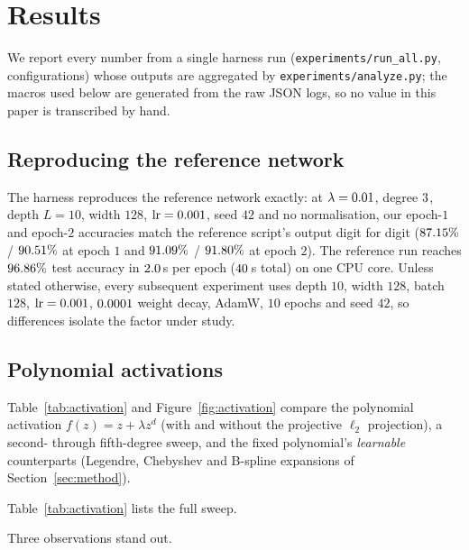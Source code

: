 \section{Results}
\label{sec:results}

We report every number from a single harness run
(\texttt{experiments/run\_all.py}, \nCfgs{} configurations) whose outputs are
aggregated by \texttt{experiments/analyze.py}; the macros used below are
generated from the raw JSON logs, so no value in this paper is transcribed by
hand.

\subsection{Reproducing the reference network}

The harness reproduces the reference network exactly: at
$\lambda=0.01$, degree $3$, depth $L=10$, width $128$,
$\text{lr}=0.001$, seed $42$ and no normalisation, our epoch-$1$ and
epoch-$2$ accuracies match the reference script's output digit for digit
($87.15\%$ / $90.51\%$ at epoch $1$ and $91.09\%$ /
$91.80\%$ at epoch $2$). The reference run reaches
$96.86\%$ test accuracy in $2.0$\,s per epoch
($40$\,s total) on one CPU core. Unless stated otherwise, every
subsequent experiment uses depth $10$, width $128$, batch $128$,
$\text{lr}=0.001$, $0.0001$ weight decay, AdamW, $10$ epochs and seed
$42$, so differences isolate the factor under study.

\subsection{Polynomial activations}
\label{sec:res-poly}

Table~\ref{tab:activation} and Figure~\ref{fig:activation} compare the
polynomial activation $f(z)=z+\lambda z^{d}$ (with and without the projective
$\ell_2$ projection), a second- through fifth-degree sweep, and the fixed
polynomial's \emph{learnable} counterparts (Legendre, Chebyshev and B-spline
expansions of Section~\ref{sec:method}).

Table~\ref{tab:activation} lists the full sweep.



Three observations stand out.

